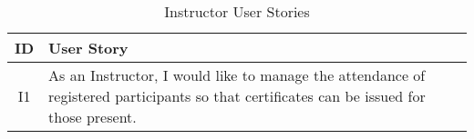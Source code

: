 \begin{table}[!htb]
  \centering
  \setlength{\aboverulesep}{0pt}
  \setlength{\belowrulesep}{0pt}
  \caption{Instructor User Stories}
  \label{tab:instructor-user-stories}
  \footnotesize
  \begin{tabularx}{\textwidth}{c|X}
    \toprule
    \rowcolor[rgb]{0.753,0.753,0.753} \textbf{ID} & \textbf{User Story}                    \\
    \hline
    \rowcolor[rgb]{0.898,0.898,0.898} I1          & As an Instructor, I would like to manage the attendance of registered participants so that certificates can be issued for those present.                                           \\
    \bottomrule
  \end{tabularx}
\end{table}